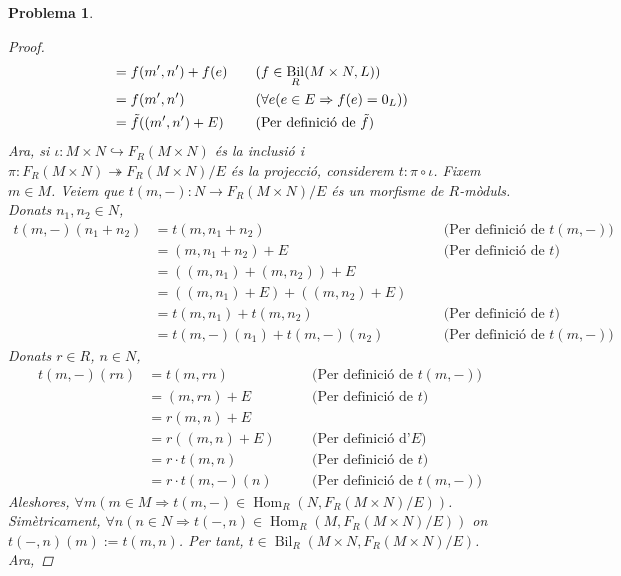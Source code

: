\documentclass[compress]{article}
\newtheorem{problema}{Problema}
\theoremstyle{definition}
\DeclareMathOperator{\Hom}{Hom}
\DeclareMathOperator{\Bil}{Bil}
\begin{document}
\begin{problema}
\begin{enumerate}
\begin{proof}
\begin{align*}
                &=f(m',n')+f(e)
                &\quad&\textrm{($f\in\Bil_{R}(M\times N,L)$)}\\
                &=f(m',n')
                &\quad&\textrm{($\forall e(e\in E\Rightarrow f(e)=0_{L})$)}\\
                &=\Tilde{f}((m',n')+E)
                &\quad&\textrm{(Per definició de $\Tilde{f}$)}
            \end{align*}
            Ara, si $\iota:M\times N\hookrightarrow F_{R}(M\times N)$ és la inclusió i $\pi:F_{R}(M\times N)\twoheadrightarrow F_{R}(M\times N)/E$ és la projecció, considerem $t:\pi\circ\iota$. Fixem $m\in M$. Veiem que $t(m,-):N\rightarrow F_{R}(M\times N)/E$ és un morfisme de $R$-mòduls. Donats $n_{1},n_{2}\in N$,
            \begin{align*}
                t(m,-)(n_{1}+n_{2})
                &=t(m,n_{1}+n_{2})
                &\quad&\textrm{(Per definició de $t(m,-)$)}\\
                &=(m,n_{1}+n_{2})+E
                &\quad&\textrm{(Per definició de $t$)}\\
                &=((m,n_{1})+(m,n_{2}))+E\\
                &=((m,n_{1})+E)+((m,n_{2})+E)\\
                &=t(m,n_{1})+t(m,n_{2})
                &\quad&\textrm{(Per definició de $t$)}\\
                &=t(m,-)(n_{1})+t(m,-)(n_{2})
                &\quad&\textrm{(Per definició de $t(m,-)$)}
            \end{align*}
            Donats $r\in R$, $n\in N$,
            \begin{align*}
                t(m,-)(rn)
                &=t(m,rn)
                &\quad&\textrm{(Per definició de $t(m,-)$)}\\
                &=(m,rn)+E
                &\quad&\textrm{(Per definició de $t$)}\\
                &=r(m,n)+E\\
                &=r((m,n)+E)
                &\quad&\textrm{(Per definició d'$E$)}\\
                &=r\cdot t(m,n)
                &\quad&\textrm{(Per definició de $t$)}\\
                &=r\cdot t(m,-)(n)
                &\quad&\textrm{(Per definició de $t(m,-)$)}
            \end{align*}
            Aleshores, $\forall m(m\in M\Rightarrow t(m,-)\in\Hom_{R}(N,F_{R}(M\times N)/E))$. Simètricament, $\forall n(n\in N\Rightarrow t(-,n)\in\Hom_{R}(M,F_{R}(M\times N)/E))$ on $t(-,n)(m):=t(m,n)$. Per tant, $t\in\Bil_{R}(M\times N,F_{R}(M\times N)/E)$. Ara,

\end{proof}
\end{enumerate}
\end{problema}
\end{document}

